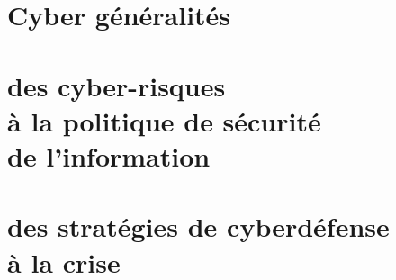 %
%



\part{Cyber généralités}

\part{des cyber-risques \\à la politique de sécurité \\de l'information}

\part{des stratégies de cyberdéfense \\à la crise}

